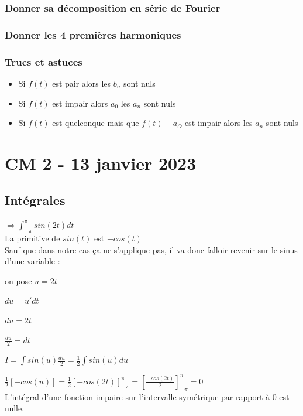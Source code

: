 \documentclass[12pt, a4paper]{article}
\begin{document}
\subsubsection{Donner sa décomposition en série de Fourier}

\subsubsection{Donner les 4 premières harmoniques}

\subsubsection{Trucs et astuces}

\begin{itemize}
    \item Si $ f(t) $ est pair alors les $ b_{n} $ sont nuls
    \item Si $ f(t) $ est impair alors $ a_{0} $ les $ a_{n} $ sont nuls
    \item Si $ f(t) $ est quelconque mais que $ f(t) - a_{O} $ est impair alors les
    $ a_{n} $ sont nuls 
\end{itemize}

\newpage

\section{CM 2 - 13 janvier 2023}
\subsection{Intégrales}
\par $ \Rightarrow \int_{- \pi}^{\pi}  sin(2t)dt $\\

La primitive de $ sin(t) $ est $ -cos(t) $\\

Sauf que dans notre cas ça ne s'applique pas, il va donc falloir revenir sur le
sinus d'une variable :

on pose $ u = 2t $ \\
\par $ du = u' dt $ \\
\par $ du = 2t $ \\
\par $ \frac{du}{2} = dt $ \\
\par $ I = \int sin(u)\frac{du}{2} = \frac{1}{2}\int sin(u) du $ \\
\par $ \frac{1}{2} [-cos(u)] = \frac{1}{2}[-cos(2t)]_{-\pi}^{\pi} = [\frac{-cos(2t)}{2}]_{-\pi}^{\pi} = 0 $ \\  

L'intégral d'une fonction impaire sur l'intervalle symétrique par rapport à 0 est nulle.\\
\end{document}
